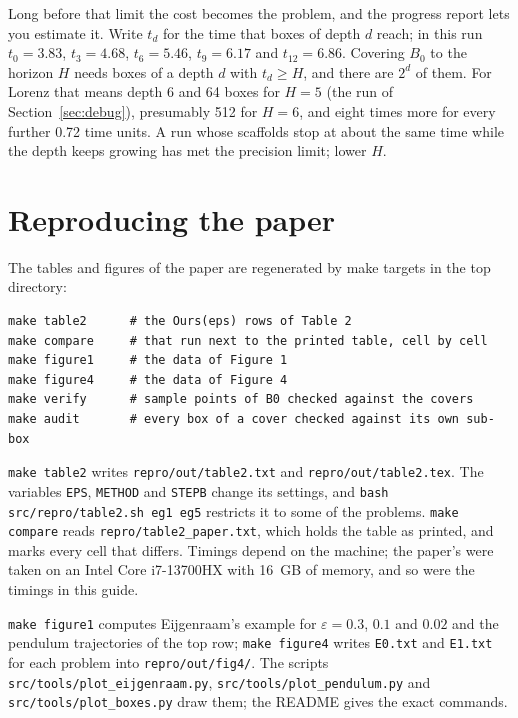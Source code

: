 \documentclass[11pt,a4paper]{article}
\newcommand{\file}[1]{\nolinkurl{#1}}
\newcommand{\eps}{\varepsilon}
\begin{document}
Long before that limit the cost becomes the problem, and the progress
report lets you estimate it. Write $t_d$ for the time that boxes of depth $d$
reach; in this run $t_0 = 3.83$, $t_3 = 4.68$, $t_6 = 5.46$, $t_9 = 6.17$ and
$t_{12} = 6.86$. Covering $B_0$ to the horizon $H$ needs boxes of a depth $d$
with $t_d \ge H$, and there are $2^d$ of them. For Lorenz that means depth 6
and 64 boxes for $H = 5$ (the run of Section~\ref{sec:debug}), presumably 512
for $H = 6$, and eight times more for every further 0.72 time units. A run
whose scaffolds stop at about the same time while the depth keeps growing has
met the precision limit; lower $H$.

\section{Reproducing the paper}\label{sec:repro}

The tables and figures of the paper are regenerated by make targets in the
top directory:
\begin{Verbatim}
make table2      # the Ours(eps) rows of Table 2
make compare     # that run next to the printed table, cell by cell
make figure1     # the data of Figure 1
make figure4     # the data of Figure 4
make verify      # sample points of B0 checked against the covers
make audit       # every box of a cover checked against its own sub-box
\end{Verbatim}
\texttt{make table2} writes \file{repro/out/table2.txt} and
\file{repro/out/table2.tex}. The variables \texttt{EPS}, \texttt{METHOD} and
\texttt{STEPB} change its settings, and \verb|bash src/repro/table2.sh eg1 eg5|
restricts it to some of the problems. \texttt{make compare} reads
\file{repro/table2_paper.txt}, which holds the table as printed, and marks
every cell that differs. Timings depend on the machine; the paper's were
taken on an Intel Core i7-13700HX with 16~GB of memory, and so were the
timings in this guide.

\texttt{make figure1} computes Eijgenraam's example for $\eps = 0.3$, $0.1$
and $0.02$ and the pendulum trajectories of the top row;
\texttt{make figure4} writes \file{E0.txt} and \file{E1.txt} for each problem
into \file{repro/out/fig4/}. The scripts \file{src/tools/plot_eijgenraam.py},
\file{src/tools/plot_pendulum.py} and \file{src/tools/plot_boxes.py} draw them; the
README gives the exact commands.
\end{document}
